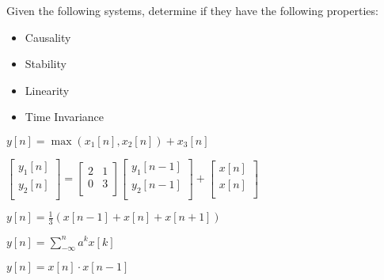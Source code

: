 
Given the following systems, determine if they have the following properties:
\begin{itemize}
  \item Causality
  \item Stability
  \item Linearity
  \item Time Invariance
\end{itemize}

\begin{enumerate}

\qitem
$y[n] = \max(x_1[n], x_2[n]) + x_3[n]$


\qitem
$
\begin{bmatrix}
y_1[n] \\
y_2[n] \\
\end{bmatrix}
=
\begin{bmatrix}
2 & 1 \\
0 & 3 \\
\end{bmatrix}
\begin{bmatrix}
y_1[n-1] \\
y_2[n-1] \\
\end{bmatrix}
+
\begin{bmatrix}
x[n] \\
x[n] \\
\end{bmatrix}
$


\qitem
$y[n] = \frac{1}{3}(x[n-1] + x[n] + x[n+1])$


\qitem
$y[n] = \sum^{n}_{-\infty} a^{k}x[k]$


\qitem
$y[n] = x[n] \cdot x[n-1]$






\end{enumerate}

